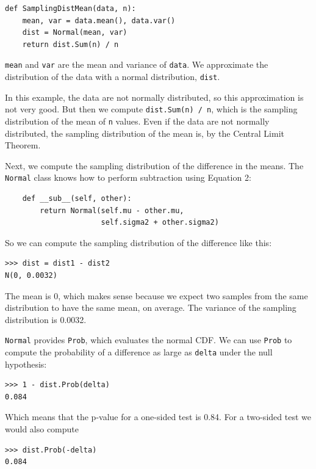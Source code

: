 \documentclass[12pt]{book}
\begin{document}
\begin{verbatim}
def SamplingDistMean(data, n):
    mean, var = data.mean(), data.var()
    dist = Normal(mean, var)
    return dist.Sum(n) / n
\end{verbatim}

{\tt mean} and {\tt var} are the mean and variance of
{\tt data}.  We approximate the distribution of the data with
a normal distribution, {\tt dist}.  

In this example, the data are not normally distributed, so this
approximation is not very good.  But then we compute {\tt dist.Sum(n)
  / n}, which is the sampling distribution of the mean of {\tt n}
values.  Even if the data are not normally distributed, the sampling
distribution of the mean is, by the Central Limit Theorem.

Next, we compute the sampling distribution of the difference
in the means.  The {\tt Normal} class knows how to perform
subtraction using Equation 2:

\begin{verbatim}
    def __sub__(self, other):
        return Normal(self.mu - other.mu,
                      self.sigma2 + other.sigma2)
\end{verbatim}

So we can compute the sampling distribution of the difference like this:

\begin{verbatim}
>>> dist = dist1 - dist2
N(0, 0.0032)
\end{verbatim}

The mean is 0, which makes sense because we expect two samples from
the same distribution to have the same mean, on average.  The variance
of the sampling distribution is 0.0032.

{\tt Normal} provides {\tt Prob}, which evaluates the normal CDF.
We can use {\tt Prob} to compute the probability of a
difference as large as {\tt delta} under the null hypothesis:

\begin{verbatim}
>>> 1 - dist.Prob(delta)
0.084
\end{verbatim}

Which means that the p-value for a one-sided test is 0.84.  For
a two-sided test we would also compute

\begin{verbatim}
>>> dist.Prob(-delta)
0.084
\end{verbatim}
\end{document}
